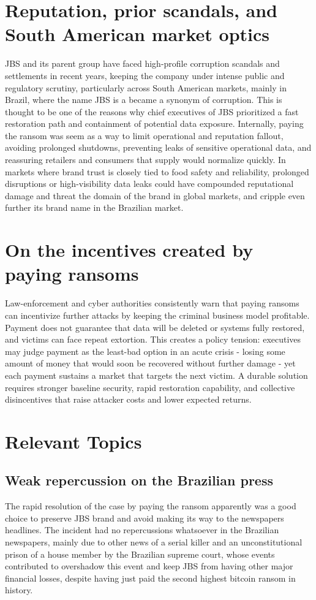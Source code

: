 \documentclass[conference]{IEEEtran}
\begin{document}
\section{Reputation, prior scandals, and South American market optics}
JBS and its parent group have faced high-profile corruption scandals and settlements in recent years, keeping the company under intense public and regulatory scrutiny, particularly across South American markets, mainly in Brazil, where the name JBS is a became a synonym of corruption. This is thought to be one of the reasons why chief executives of JBS prioritized a fast restoration path and containment of potential data exposure. Internally, paying the ransom was seem as a way to limit operational and reputation fallout, avoiding prolonged shutdowns, preventing leaks of sensitive operational data, and reassuring retailers and consumers that supply would normalize quickly. In markets where brand trust is closely tied to food safety and reliability, prolonged disruptions or high-visibility data leaks could have compounded reputational damage and threat the domain of the brand in global markets, and cripple even further its brand name in the Brazilian market.

\section{On the incentives created by paying ransoms}
Law-enforcement and cyber authorities consistently warn that paying ransoms can incentivize further attacks by keeping the criminal business model profitable. Payment does not guarantee that data will be deleted or systems fully restored, and victims can face repeat extortion. This creates a policy tension: executives may judge payment as the least-bad option in an acute crisis - losing some amount of money that would soon be recovered without further damage - yet each payment sustains a market that targets the next victim. A durable solution requires stronger baseline security, rapid restoration capability, and collective disincentives that raise attacker costs and lower expected returns.

\section{Relevant Topics}

\subsection{Weak repercussion on the Brazilian press}
The rapid resolution of the case by paying the ransom apparently was a good choice to preserve JBS brand and avoid making its way to the newspapers headlines. The incident had no repercussions whatsoever in the Brazilian newspapers, mainly due to other news of a serial killer and an unconstitutional prison of a house member by the Brazilian supreme court, whose events contributed to overshadow this event and keep JBS from having other major financial losses, despite having just paid the second highest bitcoin ransom in history.
\end{document}
